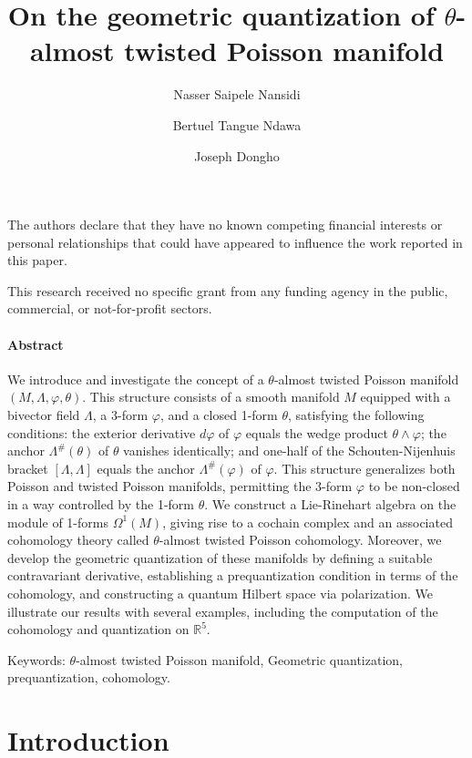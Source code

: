 \documentclass[a4paper,10pt]{article}
\title{On  the geometric quantization of  $\theta$-almost twisted Poisson manifold}
\author[1]{Nasser Saipele Nansidi}
\author[2,3]{Bertuel Tangue Ndawa}
\author[1]{Joseph Dongho}
\affil[1]{Faculty of Science, University of Maroua, Cameroon.}
\affil[2]{University Institute of Technology, University of Ngaoundere, Cameroon.}
\affil[3]{Institut des Hautes \'{e}tudes Scientifiques, Universit\'{e} Paris-Saclay, France.}
\date{}
\numberwithin{equation}{section}
\theoremstyle{plain}
\begin{document}
\maketitle
{}




The authors declare that they have no known competing financial interests or personal relationships that could have appeared to influence the work reported in this paper.

This research received no specific grant from any funding agency in the public, commercial, or not-for-profit sectors.


	\paragraph{Abstract}


We introduce and investigate the concept of a $\theta$-almost twisted Poisson manifold $(M,\Lambda,\varphi,\theta)$.  This structure consists of a smooth manifold $M$ equipped with a bivector field $\Lambda$, a 3-form $\varphi$, and a closed 1-form $\theta$, satisfying the following conditions: the exterior derivative $d\varphi$ of $\varphi$ equals the wedge product $\theta \wedge \varphi$; the anchor $\Lambda^\#(\theta)$ of $\theta$ vanishes identically; and one-half of the Schouten-Nijenhuis bracket $[\Lambda, \Lambda]$ equals the anchor $\Lambda^\#(\varphi)$ of $\varphi$. This structure generalizes both Poisson and twisted Poisson manifolds, permitting the 3-form $\varphi$ to be non-closed in a way controlled by the 1-form $\theta$.
We construct a Lie-Rinehart algebra on the module of 1-forms $\Omega^1(M)$, giving rise to a cochain complex and an associated cohomology theory called $\theta$-almost twisted Poisson cohomology.  Moreover, we develop the geometric quantization of these manifolds by defining a suitable contravariant derivative, establishing a prequantization condition in terms of the cohomology, and constructing a quantum Hilbert space via polarization. We illustrate our results with several examples, including the computation of the cohomology and quantization on $\mathbb{R}^5$.
	\medskip
	
	Keywords: $\theta$-almost twisted Poisson manifold, Geometric quantization, prequantization, cohomology.
	
	
	
	\section{Introduction}
\end{document}

